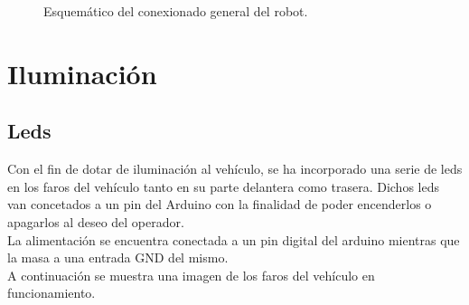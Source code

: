 \begin{figure}[H]
  \caption{Esquemático del conexionado general del robot.}
  \label{fig:esquematico-conexiones}
\end{figure}


\section{Iluminación}


\subsection{Leds}

Con el fin de dotar de iluminación al vehículo, se ha incorporado una serie de leds en los faros del vehículo tanto en su parte delantera como trasera. Dichos leds van concetados
a un pin del Arduino con la finalidad de poder encenderlos o apagarlos al deseo del operador. \\

La alimentación se encuentra conectada a un pin digital del arduino mientras que la masa a una entrada GND del mismo.\\

A continuación se muestra una imagen de los faros del vehículo en funcionamiento.\\


